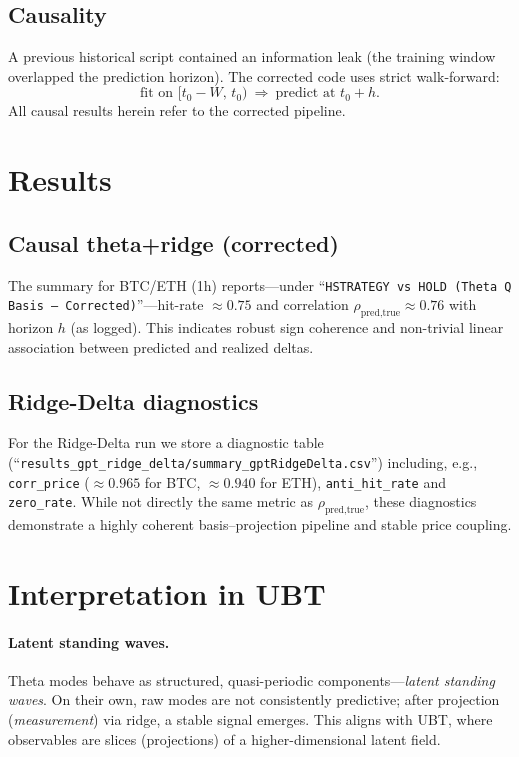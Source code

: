 \documentclass[11pt,a4paper]{article}
\begin{document}
\subsection{Causality}
A previous historical script contained an information leak (the training window overlapped the prediction horizon). The corrected code uses strict walk-forward:
\[
\text{fit on }[t_0-W,\,t_0)\ \Rightarrow\ \text{predict at }t_0+h.
\]
All causal results herein refer to the corrected pipeline.

\section{Results}
\subsection{Causal theta+ridge (corrected)}
The summary for BTC/ETH (1h) reports---under ``\texttt{HSTRATEGY vs HOLD (Theta Q Basis -- Corrected)}''---hit-rate $\approx 0.75$ and correlation $\rho_{\text{pred,true}}\approx 0.76$ with horizon $h$ (as logged). This indicates robust sign coherence and non-trivial linear association between predicted and realized deltas.

\subsection{Ridge-Delta diagnostics}
For the Ridge-Delta run we store a diagnostic table (``\texttt{results\_gpt\_ridge\_delta/summary\_gptRidgeDelta.csv}'') including, e.g., \texttt{corr\_price} ($\approx 0.965$ for BTC, $\approx 0.940$ for ETH), \texttt{anti\_hit\_rate} and \texttt{zero\_rate}. While not directly the same metric as $\rho_{\text{pred,true}}$, these diagnostics demonstrate a highly coherent basis--projection pipeline and stable price coupling.

\section{Interpretation in UBT}
\paragraph{Latent standing waves.}
Theta modes behave as structured, quasi-periodic components---\emph{latent standing waves}. On their own, raw modes are not consistently predictive; after projection (\emph{measurement}) via ridge, a stable signal emerges. This aligns with UBT, where observables are slices (projections) of a higher-dimensional latent field.
\end{document}

